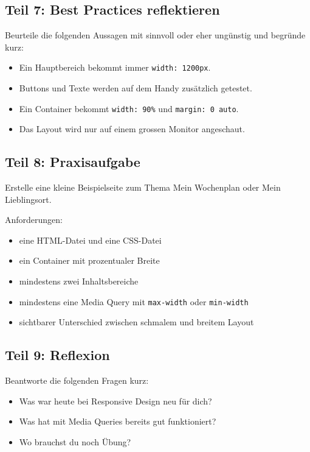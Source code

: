 \documentclass[a4paper,12pt]{article}
\begin{document}
\subsection*{Teil 7: Best Practices reflektieren}
Beurteile die folgenden Aussagen mit \glqq sinnvoll\grqq{} oder \glqq eher ungünstig\grqq{} und begründe kurz:
\begin{itemize}
  \item Ein Hauptbereich bekommt immer \texttt{width: 1200px}.
  \item Buttons und Texte werden auf dem Handy zusätzlich getestet.
  \item Ein Container bekommt \texttt{width: 90\%} und \texttt{margin: 0 auto}.
  \item Das Layout wird nur auf einem grossen Monitor angeschaut.
\end{itemize}

\subsection*{Teil 8: Praxisaufgabe}
Erstelle eine kleine Beispielseite zum Thema \glqq Mein Wochenplan\grqq{} oder \glqq Mein Lieblingsort\grqq{}.

Anforderungen:
\begin{itemize}
  \item eine HTML-Datei und eine CSS-Datei
  \item ein Container mit prozentualer Breite
  \item mindestens zwei Inhaltsbereiche
  \item mindestens eine Media Query mit \texttt{max-width} oder \texttt{min-width}
  \item sichtbarer Unterschied zwischen schmalem und breitem Layout
\end{itemize}

\subsection*{Teil 9: Reflexion}
Beantworte die folgenden Fragen kurz:
\begin{itemize}
  \item Was war heute bei Responsive Design neu für dich?
  \item Was hat mit Media Queries bereits gut funktioniert?
  \item Wo brauchst du noch Übung?
\end{itemize}
\end{document}
